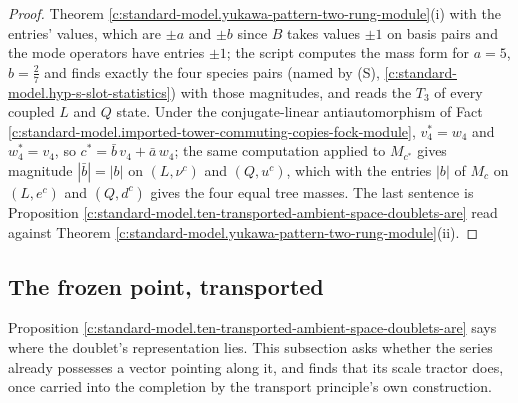 \documentclass[11pt]{article}
\theoremstyle{definition}
\theoremstyle{plain}
\begin{document}
\begin{proof}
Theorem \ref{c:standard-model.yukawa-pattern-two-rung-module}(i) with the entries' values, which are $\pm a$ and $\pm b$ since $B$ takes values $\pm 1$ on basis pairs and the mode operators have entries $\pm 1$; the script computes the mass form for $a = 5$, $b = \tfrac27$ and finds exactly the four species pairs (named by (S), \ref{c:standard-model.hyp-s-slot-statistics}) with those magnitudes, and reads the $T_{3}$ of every coupled $L$ and $Q$ state. Under the conjugate-linear antiautomorphism of Fact \ref{c:standard-model.imported-tower-commuting-copies-fock-module}, $v_{4}^{*} = w_{4}$ and $w_{4}^{*} = v_{4}$, so $c^{*} = \bar{b}\,v_{4} + \bar{a}\,w_{4}$; the same computation applied to $M_{c^{*}}$ gives magnitude $|\bar{b}| = |b|$ on $(L, \nu^{c})$ and $(Q, u^{c})$, which with the entries $|b|$ of $M_{c}$ on $(L, e^{c})$ and $(Q, d^{c})$ gives the four equal tree masses. The last sentence is Proposition \ref{c:standard-model.ten-transported-ambient-space-doublets-are} read against Theorem \ref{c:standard-model.yukawa-pattern-two-rung-module}(ii).

\end{proof}

\subsection*{The frozen point, transported}
\label{c:note.standard-model.setting-frozen-point-transported}
Proposition \ref{c:standard-model.ten-transported-ambient-space-doublets-are} says where the doublet's representation lies. This subsection asks whether the series already possesses a vector pointing along it, and finds that its scale tractor does, once carried into the completion by the transport principle's own construction.
\end{document}
